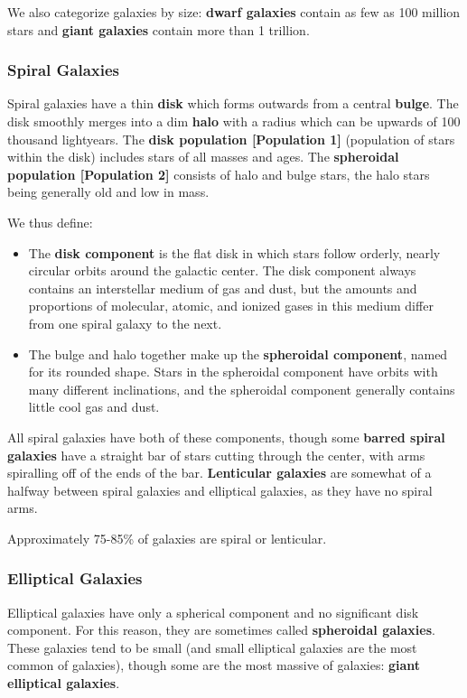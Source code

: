 \documentclass[12pt]{article}
\begin{document}
We also categorize galaxies by size: {\bf dwarf galaxies} contain as few as 100 million stars and {\bf giant galaxies} contain more than 1 trillion.

\subsubsection{Spiral Galaxies}
Spiral galaxies have a thin {\bf disk} which forms outwards from a central {\bf bulge}. The disk smoothly merges into a dim {\bf halo} with a radius which can be upwards of 100 thousand lightyears. The {\bf disk population [Population 1]} (population of stars within the disk) includes stars of all masses and ages. The {\bf spheroidal population [Population 2]} consists of halo and bulge stars, the halo stars being generally old and low in mass.

We thus define:
\begin{itemize}
\item The {\bf disk component} is the flat disk in which stars follow orderly, nearly circular orbits around the galactic center. The disk component always contains an interstellar medium of gas and dust, but the amounts and proportions of molecular, atomic, and ionized gases in this medium differ from one spiral galaxy to the next.
\item The bulge and halo together make up the {\bf spheroidal component}, named for its rounded shape. Stars in the spheroidal component have orbits with many different inclinations, and the spheroidal component generally contains little cool gas and dust.
\end{itemize}

All spiral galaxies have both of these components, though some {\bf barred spiral galaxies} have a straight bar of stars cutting through the center, with arms spiralling off of the ends of the bar. {\bf Lenticular galaxies} are somewhat of a halfway between spiral galaxies and elliptical galaxies, as they have no spiral arms.

Approximately 75-85\% of galaxies are spiral or lenticular.

\subsubsection{Elliptical Galaxies}
Elliptical galaxies have only a spherical component and no significant disk component. For this reason, they are sometimes called {\bf spheroidal galaxies}. These galaxies tend to be small (and small elliptical galaxies are the most common of galaxies), though some are the most massive of galaxies: {\bf giant elliptical galaxies}.
\end{document}
